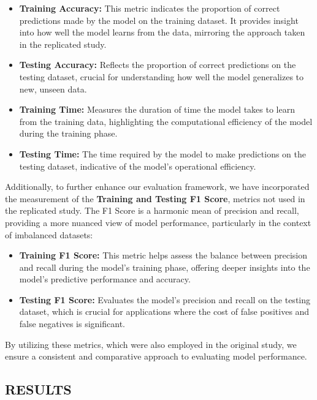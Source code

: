 \documentclass[11pt]{article}
\begin{document}
\begin{itemize}
\item
  \textbf{Training Accuracy:} This metric indicates the proportion of
  correct predictions made by the model on the training dataset. It
  provides insight into how well the model learns from the data,
  mirroring the approach taken in the replicated study.
\item
  \textbf{Testing Accuracy:} Reflects the proportion of correct
  predictions on the testing dataset, crucial for understanding how well
  the model generalizes to new, unseen data.
\item
  \textbf{Training Time:} Measures the duration of time the model takes
  to learn from the training data, highlighting the computational
  efficiency of the model during the training phase.
\item
  \textbf{Testing Time:} The time required by the model to make
  predictions on the testing dataset, indicative of the model's
  operational efficiency.
\end{itemize}

Additionally, to further enhance our evaluation framework, we have
incorporated the measurement of the \textbf{Training and Testing F1
Score}, metrics not used in the replicated study. The F1 Score is a
harmonic mean of precision and recall, providing a more nuanced view of
model performance, particularly in the context of imbalanced datasets:

\begin{itemize}
\item
  \textbf{Training F1 Score:} This metric helps assess the balance
  between precision and recall during the model's training phase,
  offering deeper insights into the model's predictive performance and
  accuracy.
\item
  \textbf{Testing F1 Score:} Evaluates the model's precision and recall
  on the testing dataset, which is crucial for applications where the
  cost of false positives and false negatives is significant.
\end{itemize}

By utilizing these metrics, which were also employed in the original
study, we ensure a consistent and comparative approach to evaluating
model performance.

    \hypertarget{results}{%
\subsection{RESULTS}\label{results}}
\end{document}
